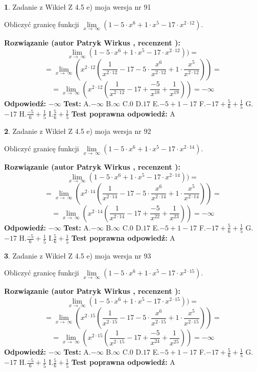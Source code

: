 \documentclass[12pt, a4paper]{article}
\theoremstyle{definition} %
\newtheorem{zad}{}
\newcommand{\zadStart}[1]{\begin{zad}#1\newline}
\newcommand{\zadStop}{\end{zad}}
\newcommand{\rozwStart}[2]{\noindent \textbf{Rozwiązanie (autor #1 , recenzent #2): }\newline}
\newcommand{\rozwStop}{\newline}
\newcommand{\odpStart}{\noindent \textbf{Odpowiedź:}\newline}
\newcommand{\odpStop}{\newline}
\newcommand{\testStart}{\noindent \textbf{Test:}\newline}
\newcommand{\testStop}{\newline}
\newcommand{\kluczStart}{\noindent \textbf{Test poprawna odpowiedź:}\newline}
\newcommand{\kluczStop}{\newline}
\begin{document}
\zadStart{Zadanie z Wikieł Z 4.5 e) moja wersja nr 91}



Obliczyć granicę funkcji  $\lim\limits_{x\to\ \infty}(1 - 5 \cdot x^{6}+1 \cdot x^{5}- 17 \cdot x^{2\cdot12})$.
\zadStop
\rozwStart{Patryk Wirkus}{}
$$\lim\limits_{x\to\ \infty}(1 - 5 \cdot x^{6}+1 \cdot x^{5}- 17 \cdot x^{2\cdot12}))=$$
$$=\lim\limits_{x\to\ \infty}(x^{2\cdot12}(\frac{1}{x^{2\cdot12}}-17 -5 \cdot \frac{x^{6}}{x^{2\cdot12}}+1 \cdot \frac{x^{5}}{x^{2\cdot12}}))=$$
$$=\lim\limits_{x\to\ \infty}(x^{2\cdot12}(\frac{1}{x^{2\cdot12}}-17 + \frac{-5}{x^{18}}+ \frac{1}{x^{19}}))=-\infty$$
\rozwStop
\odpStart
$-\infty$
\odpStop
\testStart
A.$-\infty$ B.$\infty$ C.$0$ D.$17$ E.$-5 + 1 - 17$
F.$-17+\frac{5}{6}+\frac{1}{5}$ G.$-17$
H.$\frac{-5}{6}+\frac{1}{5}$
I.$\frac{5}{6}+\frac{1}{5}$
\testStop
\kluczStart
A
\kluczStop



\zadStart{Zadanie z Wikieł Z 4.5 e) moja wersja nr 92}



Obliczyć granicę funkcji  $\lim\limits_{x\to\ \infty}(1 - 5 \cdot x^{6}+1 \cdot x^{5}- 17 \cdot x^{2\cdot14})$.
\zadStop
\rozwStart{Patryk Wirkus}{}
$$\lim\limits_{x\to\ \infty}(1 - 5 \cdot x^{6}+1 \cdot x^{5}- 17 \cdot x^{2\cdot14}))=$$
$$=\lim\limits_{x\to\ \infty}(x^{2\cdot14}(\frac{1}{x^{2\cdot14}}-17 -5 \cdot \frac{x^{6}}{x^{2\cdot14}}+1 \cdot \frac{x^{5}}{x^{2\cdot14}}))=$$
$$=\lim\limits_{x\to\ \infty}(x^{2\cdot14}(\frac{1}{x^{2\cdot14}}-17 + \frac{-5}{x^{22}}+ \frac{1}{x^{23}}))=-\infty$$
\rozwStop
\odpStart
$-\infty$
\odpStop
\testStart
A.$-\infty$ B.$\infty$ C.$0$ D.$17$ E.$-5 + 1 - 17$
F.$-17+\frac{5}{6}+\frac{1}{5}$ G.$-17$
H.$\frac{-5}{6}+\frac{1}{5}$
I.$\frac{5}{6}+\frac{1}{5}$
\testStop
\kluczStart
A
\kluczStop



\zadStart{Zadanie z Wikieł Z 4.5 e) moja wersja nr 93}



Obliczyć granicę funkcji  $\lim\limits_{x\to\ \infty}(1 - 5 \cdot x^{6}+1 \cdot x^{5}- 17 \cdot x^{2\cdot15})$.
\zadStop
\rozwStart{Patryk Wirkus}{}
$$\lim\limits_{x\to\ \infty}(1 - 5 \cdot x^{6}+1 \cdot x^{5}- 17 \cdot x^{2\cdot15}))=$$
$$=\lim\limits_{x\to\ \infty}(x^{2\cdot15}(\frac{1}{x^{2\cdot15}}-17 -5 \cdot \frac{x^{6}}{x^{2\cdot15}}+1 \cdot \frac{x^{5}}{x^{2\cdot15}}))=$$
$$=\lim\limits_{x\to\ \infty}(x^{2\cdot15}(\frac{1}{x^{2\cdot15}}-17 + \frac{-5}{x^{24}}+ \frac{1}{x^{25}}))=-\infty$$
\rozwStop
\odpStart
$-\infty$
\odpStop
\testStart
A.$-\infty$ B.$\infty$ C.$0$ D.$17$ E.$-5 + 1 - 17$
F.$-17+\frac{5}{6}+\frac{1}{5}$ G.$-17$
H.$\frac{-5}{6}+\frac{1}{5}$
I.$\frac{5}{6}+\frac{1}{5}$
\testStop
\kluczStart
A
\kluczStop
\end{document}
